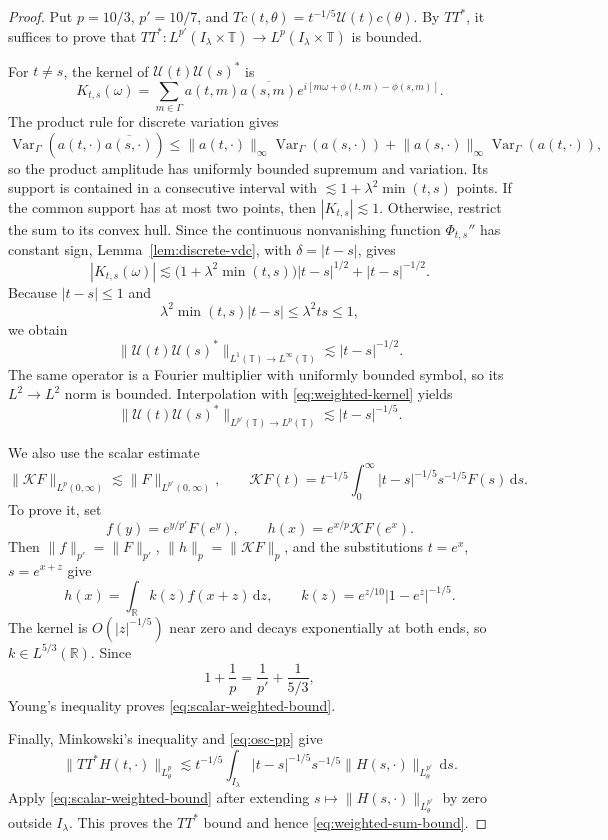 \documentclass[10pt,a4paper]{amsart}
\numberwithin{equation}{section}
\newcommand{\T}{\mathbb T}
\newcommand{\dd}{\,\mathrm d}
\newcommand{\norm}[1]{\lVert #1\rVert}
\begin{document}
\begin{proof}
Put \(p=10/3\), \(p'=10/7\), and
\(Tc(t,\theta)=t^{-1/5}\mathcal U(t)c(\theta)\). By \(TT^*\), it suffices to
prove that \(TT^*:L^{p'}(I_\lambda\times\T)\to
L^p(I_\lambda\times\T)\) is bounded.

For \(t\ne s\), the kernel of \(\mathcal U(t)\mathcal U(s)^*\) is
\[
 K_{t,s}(\omega)
 =\sum_{m\in\Gamma}a(t,m)\overline{a(s,m)}
 e^{i[m\omega+\phi(t,m)-\phi(s,m)]}.
\]
The product rule for discrete variation gives
\[
 \operatorname{Var}_\Gamma(a(t,\cdot)\overline{a(s,\cdot)})
 \le \norm{a(t,\cdot)}_\infty\operatorname{Var}_\Gamma(a(s,\cdot))
 +\norm{a(s,\cdot)}_\infty\operatorname{Var}_\Gamma(a(t,\cdot)),
\]
so the product amplitude has uniformly bounded supremum and variation. Its
support is contained in a consecutive interval with
\(\lesssim1+\lambda^2\min(t,s)\) points. If the common support has at most two
points, then \(|K_{t,s}|\lesssim1\). Otherwise, restrict the sum to its convex
hull. Since the continuous nonvanishing function \(\Phi_{t,s}''\) has constant
sign, Lemma~\ref{lem:discrete-vdc}, with \(\delta=|t-s|\), gives
\[
 |K_{t,s}(\omega)|
 \lesssim
 \bigl(1+\lambda^2\min(t,s)\bigr)|t-s|^{1/2}
 +|t-s|^{-1/2}.
\]
Because \(|t-s|\le1\) and
\[
 \lambda^2\min(t,s)|t-s|\le\lambda^2ts\le1,
\]
we obtain
\begin{equation}\label{eq:weighted-kernel}
 \norm{\mathcal U(t)\mathcal U(s)^*}_{L^1(\T)\to L^\infty(\T)}
 \lesssim|t-s|^{-1/2}.
\end{equation}
The same operator is a Fourier multiplier with uniformly bounded symbol, so
its \(L^2\to L^2\) norm is bounded. Interpolation with
\eqref{eq:weighted-kernel} yields
\begin{equation}\label{eq:osc-pp}
 \norm{\mathcal U(t)\mathcal U(s)^*}_{L^{p'}(\T)\to L^p(\T)}
 \lesssim|t-s|^{-1/5}.
\end{equation}

We also use the scalar estimate
\begin{equation}\label{eq:scalar-weighted-bound}
 \norm{\mathcal K F}_{L^p(0,\infty)}
 \lesssim\norm F_{L^{p'}(0,\infty)},
 \qquad
 \mathcal K F(t)=t^{-1/5}\int_0^\infty
 |t-s|^{-1/5}s^{-1/5}F(s)\dd s.
\end{equation}
To prove it, set
\[
 f(y)=e^{y/p'}F(e^y),\qquad
 h(x)=e^{x/p}\mathcal K F(e^x).
\]
Then \(\norm f_{p'}=\norm F_{p'}\),
\(\norm h_p=\norm{\mathcal K F}_p\), and the substitutions
\(t=e^x\), \(s=e^{x+z}\) give
\[
 h(x)=\int_\mathbb R k(z)f(x+z)\dd z,
 \qquad k(z)=e^{z/10}|1-e^z|^{-1/5}.
\]
The kernel is \(O(|z|^{-1/5})\) near zero and decays exponentially at both
ends, so \(k\in L^{5/3}(\mathbb R)\). Since
\[
 1+\frac1p=\frac1{p'}+\frac1{5/3},
\]
Young's inequality proves \eqref{eq:scalar-weighted-bound}.

Finally, Minkowski's inequality and \eqref{eq:osc-pp} give
\[
 \norm{TT^*H(t,\cdot)}_{L_\theta^p}
 \lesssim t^{-1/5}\int_{I_\lambda}|t-s|^{-1/5}s^{-1/5}
 \norm{H(s,\cdot)}_{L_\theta^{p'}}\dd s.
\]
Apply \eqref{eq:scalar-weighted-bound} after extending
\(s\mapsto\norm{H(s,\cdot)}_{L_\theta^{p'}}\) by zero outside
\(I_\lambda\). This proves the \(TT^*\) bound and hence
\eqref{eq:weighted-sum-bound}.
\end{proof}
\end{document}
